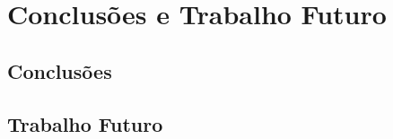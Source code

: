 \chapter{Conclusões e Trabalho Futuro}
\label{ch::conc}

\section{Conclusões}
\label{sec::conc:conc}

\todo{}


\section{Trabalho Futuro}
\label{sec::conc:futuro}

\todo{}
